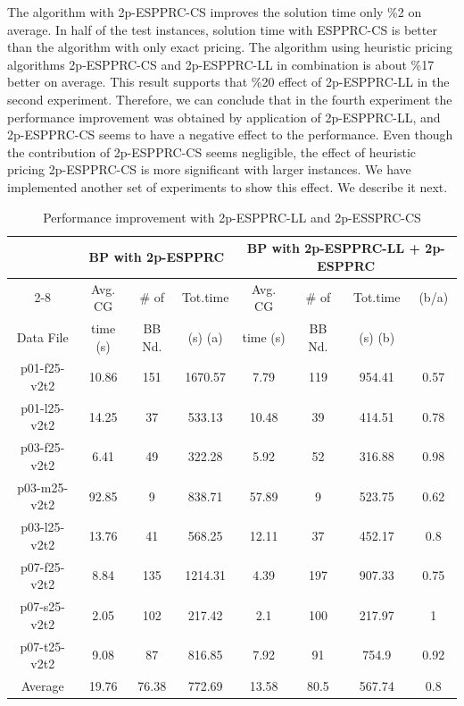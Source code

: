 The algorithm with  2p-ESPPRC-CS improves the solution time only \%2 on average. In half of
the test instances, solution time with ESPPRC-CS is better than the algorithm with only
exact pricing. The algorithm using heuristic pricing algorithms 2p-ESPPRC-CS and 2p-ESPPRC-LL
in combination is about \%17 better on average. This result supports that \%20 effect of
2p-ESPPRC-LL in the second experiment. Therefore, we can conclude that in the fourth experiment
the performance improvement was obtained by application of 2p-ESPPRC-LL, and
2p-ESPPRC-CS seems to have a negative effect to the performance. Even though the contribution
of 2p-ESPPRC-CS seems negligible, the effect of heuristic pricing 2p-ESPPRC-CS is more significant
with larger instances. We have implemented another set of experiments to show this effect. We
describe it next.
\begin{table}[h]
\centering
\caption{Performance improvement with 2p-ESPPRC-LL and 2p-ESSPRC-CS}\label{compexp-comp-pri2}
\begin {tabular}[h]{|c|c|c|c|c|c|c|c|}
\hline
\mbox{} & \multicolumn{3}{|c|}{BP with 2p-ESPPRC} & \multicolumn{4}{|c|}{BP with 2p-ESPPRC-LL + 2p-ESPPRC} \\\cline {2-8}
\mbox{} &  Avg. CG   & \# of    & Tot.time  &  Avg. CG   & \# of    & Tot.time  & (b/a) \\
Data File & time (s) & BB Nd.   & (s) (a) &  time (s)  & BB Nd.   & (s) (b) &  \mbox{} \\\hline
p01-f25-v2t2    & 10.86 & 151   & 1670.57 & 7.79    & 119   & 954.41    & 0.57  \\
p01-l25-v2t2    & 14.25 & 37    & 533.13  & 10.48   & 39    & 414.51    & 0.78  \\
p03-f25-v2t2    & 6.41  & 49    & 322.28  & 5.92    & 52    & 316.88    & 0.98  \\
p03-m25-v2t2    & 92.85 & 9 & 838.71  & 57.89   & 9 & 523.75    & 0.62  \\
p03-l25-v2t2    & 13.76 & 41    & 568.25  & 12.11   & 37    & 452.17    & 0.8   \\
p07-f25-v2t2    & 8.84  & 135   & 1214.31 & 4.39    & 197   & 907.33    & 0.75  \\
p07-s25-v2t2    & 2.05  & 102   & 217.42  & 2.1         & 100   & 217.97    & 1 \\
p07-t25-v2t2    & 9.08  & 87    & 816.85  & 7.92    & 91    & 754.9     & 0.92  \\\hline
Average     & 19.76 & 76.38 & 772.69  & 13.58   & 80.5  & 567.74    & 0.8   \\\hline

\end{tabular}
\end{table}
